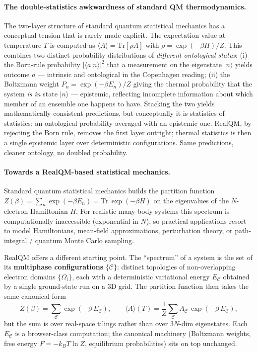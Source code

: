 \documentclass[11pt]{article}
\begin{document}
\paragraph{The double-statistics awkwardness of standard QM thermodynamics.}
The two-layer structure of standard quantum statistical mechanics has a conceptual tension that is rarely made explicit. The expectation value at temperature $T$ is computed as
$\langle A \rangle = \mathrm{Tr}[\rho A]$ with $\rho = \exp(-\beta H)/Z$. This combines two distinct probability distributions of \emph{different ontological status}: (i) the Born-rule probability $|\langle a | n \rangle|^2$ that a measurement on the eigenstate $|n\rangle$ yields outcome $a$ --- intrinsic and ontological in the Copenhagen reading; (ii) the Boltzmann weight $P_n = \exp(-\beta E_n)/Z$ giving the thermal probability that the system \emph{is in} state $|n\rangle$ --- epistemic, reflecting incomplete information about which member of an ensemble one happens to have. Stacking the two yields mathematically consistent predictions, but conceptually it is statistics of statistics: an ontological probability averaged with an epistemic one. RealQM, by rejecting the Born rule, removes the first layer outright; thermal statistics is then a single epistemic layer over deterministic configurations. Same predictions, cleaner ontology, no doubled probability.

\paragraph{Towards a RealQM-based statistical mechanics.}
Standard quantum statistical mechanics builds the partition function $Z(\beta) = \sum_n \exp(-\beta E_n) = \mathrm{Tr}\,\exp(-\beta H)$ on the eigenvalues of the $N$-electron Hamiltonian $H$. For realistic many-body systems this spectrum is computationally inaccessible (exponential in $N$), so practical applications resort to model Hamiltonians, mean-field approximations, perturbation theory, or path-integral / quantum Monte Carlo sampling.

RealQM offers a different starting point. The ``spectrum'' of a system is the set of its \textbf{multiphase configurations} $\{\mathcal{C}\}$: distinct topologies of non-overlapping electron domains $\{\Omega_i\}$, each with a deterministic variational energy $E_\mathcal{C}$ obtained by a single ground-state run on a 3D grid. The partition function then takes the same canonical form
\begin{equation}
Z(\beta) = \sum_\mathcal{C} \exp(-\beta\,E_\mathcal{C}), \qquad
\langle A \rangle(T) = \frac{1}{Z} \sum_\mathcal{C} A_\mathcal{C}\, \exp(-\beta\,E_\mathcal{C}),
\end{equation}
but the sum is over real-space tilings rather than over $3N$-dim eigenstates. Each $E_\mathcal{C}$ is a browser-class computation; the canonical machinery (Boltzmann weights, free energy $F = -k_B T \ln Z$, equilibrium probabilities) sits on top unchanged.
\end{document}
